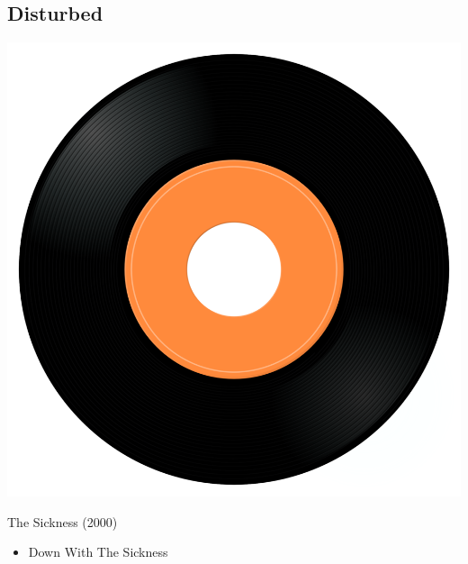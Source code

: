 \subsection{Disturbed}

\begin{minipage}[t]{0.25\textwidth}
\captionsetup{type=figure}
\includegraphics[width=\textwidth]{Images/cover.png}
\caption*{The Sickness (2000)}
\end{minipage}
\begin{minipage}[t]{0.25\textwidth}\vspace{0pt}
\begin{itemize}[nosep,leftmargin=1em,labelwidth=*,align=left]
	\setlength{\itemsep}{0pt}
	\item Down With The Sickness
\end{itemize}
\end{minipage}
